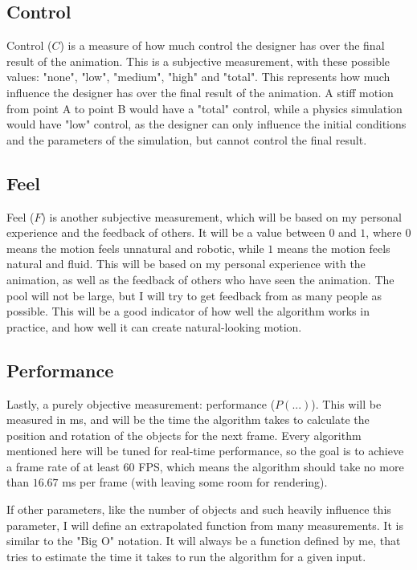 \subsection{Control}
\label{subsec:control}

Control (\({C}\)) is a measure of how much control the designer has over the final result of the animation. This is a subjective measurement, with these possible values: "none", "low", "medium", "high" and "total". This represents how much influence the designer has over the final result of the animation. A stiff motion from point A to point B would have a "total" control, while a physics simulation would have "low" control, as the designer can only influence the initial conditions and the parameters of the simulation, but cannot control the final result.

\pagebreak

\subsection{Feel}
\label{subsec:feel}

Feel (\(F\)) is another subjective measurement, which will be based on my personal experience and the feedback of others. It will be a value between \(0\) and \(1\), where \(0\) means the motion feels unnatural and robotic, while \(1\) means the motion feels natural and fluid. This will be based on my personal experience with the animation, as well as the feedback of others who have seen the animation. The pool will not be large, but I will try to get feedback from as many people as possible. This will be a good indicator of how well the algorithm works in practice, and how well it can create natural-looking motion.

\subsection{Performance}
\label{subsec:performance}

Lastly, a purely objective measurement: performance (\(P(...)\)). This will be measured in ms, and will be the time the algorithm takes to calculate the position and rotation of the objects for the next frame. Every algorithm mentioned here will be tuned for real-time performance, so the goal is to achieve a frame rate of at least \(60\) FPS, which means the algorithm should take no more than \(16.67\) ms per frame (with leaving some room for rendering). 

If other parameters, like the number of objects and such heavily influence this parameter, I will define an extrapolated function from many measurements. It is similar to the "Big O" notation. It will always be a function defined by me, that tries to estimate the time it takes to run the algorithm for a given input.

